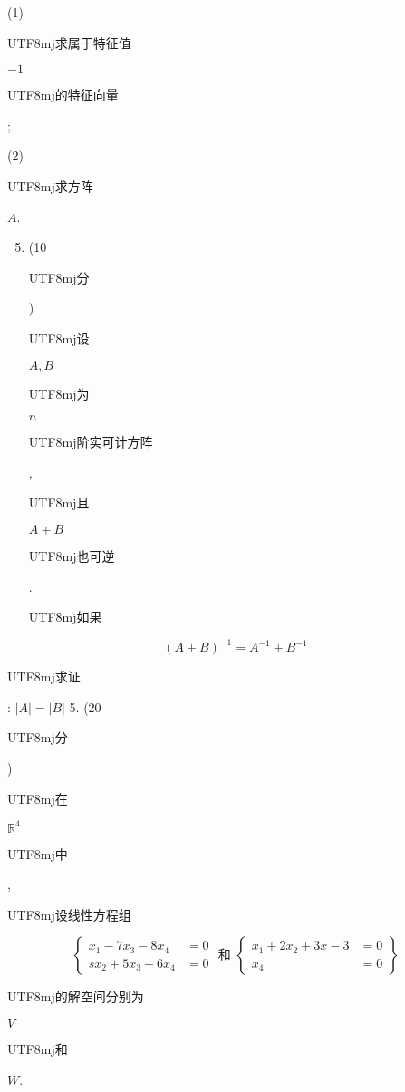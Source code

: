 \documentclass[10pt]{article}
\begin{document}
(1) \begin{CJK}{UTF8}{mj}求属于特征值\end{CJK} $-1$ \begin{CJK}{UTF8}{mj}的特征向量\end{CJK};

(2) \begin{CJK}{UTF8}{mj}求方阵\end{CJK} $A$.

\begin{enumerate}
  \setcounter{enumi}{4}
  \item (10 \begin{CJK}{UTF8}{mj}分\end{CJK}) \begin{CJK}{UTF8}{mj}设\end{CJK} $A, B$ \begin{CJK}{UTF8}{mj}为\end{CJK} $n$ \begin{CJK}{UTF8}{mj}阶实可计方阵\end{CJK}, \begin{CJK}{UTF8}{mj}且\end{CJK} $A+B$ \begin{CJK}{UTF8}{mj}也可逆\end{CJK}. \begin{CJK}{UTF8}{mj}如果\end{CJK}
\end{enumerate}
$$
(A+B)^{-1}=A^{-1}+B^{-1}
$$
\begin{CJK}{UTF8}{mj}求证\end{CJK}: $|A|=|B|$ 5. (20 \begin{CJK}{UTF8}{mj}分\end{CJK}) \begin{CJK}{UTF8}{mj}在\end{CJK} $\mathbb{R}^{4}$ \begin{CJK}{UTF8}{mj}中\end{CJK}, \begin{CJK}{UTF8}{mj}设线性方程组\end{CJK}
$$
\left\{\begin{aligned}
x_{1}-7 x_{3}-8 x_{4} &=0 \\
s x_{2}+5 x_{3}+6 x_{4} &=0
\end{aligned} \text { 和 }\left\{\begin{aligned}
x_{1}+2 x_{2}+3 x-3 &=0 \\
x_{4} &=0
\end{aligned}\right\}\right.
$$
\begin{CJK}{UTF8}{mj}的解空间分别为\end{CJK} $V$ \begin{CJK}{UTF8}{mj}和\end{CJK} $W$.
\end{document}
